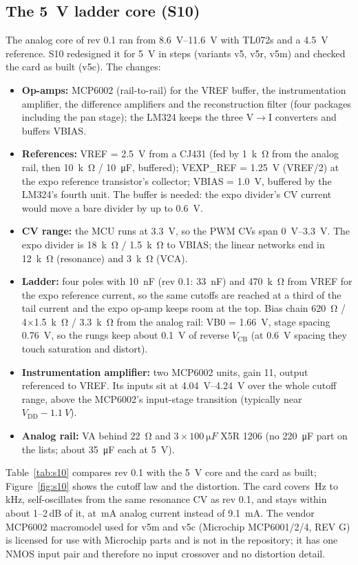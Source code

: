 \documentclass[11pt,a4paper]{article}
\begin{document}
\subsection{The \SI{5}{V} ladder core (S10)}
The analog core of rev 0.1 ran from \SIrange{8.6}{11.6}{V} with TL072s and a \SI{4.5}{V} reference. S10 redesigned it
for \SI{5}{V} in steps (variants v5, v5r, v5m) and checked the card as built (v5c). The changes:
\begin{itemize}
  \item \textbf{Op-amps:} MCP6002 (rail-to-rail) for the VREF buffer, the instrumentation amplifier, the difference
    amplifiers and the reconstruction filter (four packages including the pan stage); the LM324 keeps the three
    V$\to$I converters and buffers VBIAS.
  \item \textbf{References:} VREF = \SI{2.5}{V} from a CJ431 (fed by \SI{1}{k\ohm} from the analog rail, then
    \SI{10}{k\ohm} / \SI{10}{\micro F}, buffered); VEXP\_REF = \SI{1.25}{V} (VREF/2) at the expo reference transistor's
    collector; VBIAS = \SI{1.0}{V}, buffered by the LM324's fourth unit. The buffer is needed: the expo divider's CV
    current would move a bare divider by up to \SI{0.6}{V}.
  \item \textbf{CV range:} the MCU runs at \SI{3.3}{V}, so the PWM CVs span \SIrange{0}{3.3}{V}. The expo divider is
    \SI{18}{k\ohm} / \SI{1.5}{k\ohm} to VBIAS; the linear networks end in \SI{12}{k\ohm} (resonance) and \SI{3}{k\ohm}
    (VCA).
  \item \textbf{Ladder:} four poles with \SI{10}{nF} (rev 0.1: \SI{33}{nF}) and \SI{470}{k\ohm} from VREF for the expo
    reference current, so the same cutoffs are reached at a third of the tail current and the expo op-amp keeps room
    at the top. Bias chain \SI{620}{\ohm} / 4$\times$\SI{1.5}{k\ohm} / \SI{3.3}{k\ohm} from the analog rail: VB0 =
    \SI{1.66}{V}, stage spacing \SI{0.76}{V}, so the rungs keep about \SI{0.1}{V} of reverse $V_\mathrm{CB}$ (at
    \SI{0.6}{V} spacing they touch saturation and distort).
  \item \textbf{Instrumentation amplifier:} two MCP6002 units, gain 11, output referenced to VREF. Its inputs sit at
    \SIrange{4.04}{4.24}{V} over the whole cutoff range, above the MCP6002's input-stage transition (typically near
    $V_\mathrm{DD} - \SI{1.1}{V}$).
  \item \textbf{Analog rail:} VA behind \SI{22}{\ohm} and $3\times\SI{100}{\micro F}$ X5R 1206 (no \SI{220}{\micro F}
    part on the lists; about \SI{35}{\micro F} each at \SI{5}{V}).
\end{itemize}
Table~\ref{tab:s10} compares rev 0.1 with the \SI{5}{V} core and the card as built; Figure~\ref{fig:s10} shows the
cutoff law and the distortion. The card covers \statStenFcLow\,Hz to \statStenFcHigh\,kHz, self-oscillates from the
same resonance CV as rev 0.1, and stays within about 1--2\,dB of it, at \statStenCurrent\,mA analog current instead of
\SI{9.1}{mA}. The vendor MCP6002 macromodel used for v5m and v5c (Microchip MCP6001/2/4, REV G) is licensed for use
with Microchip parts and is not in the repository; it has one NMOS input pair and therefore no input crossover and no
distortion detail.
\end{document}
